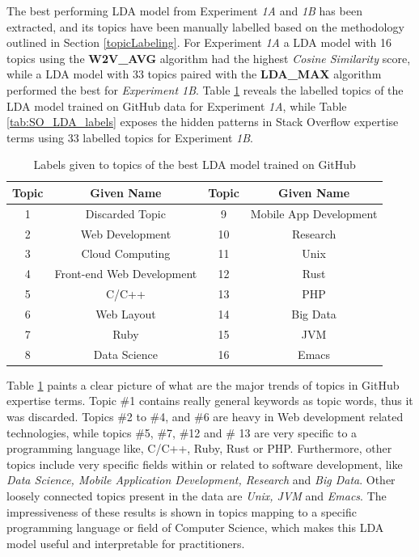            The best performing LDA model from Experiment \emph{1A} and \emph{1B} has been extracted, and its topics have been manually labelled based on the methodology outlined in Section \ref{topicLabeling}. For Experiment \emph{1A} a LDA model with 16 topics using the \textbf{W2V\_AVG} algorithm had the highest \emph{Cosine Similarity} score, while a LDA model with 33 topics paired with the \textbf{LDA\_MAX} algorithm performed the best for \emph{Experiment 1B}. Table \ref{tab:GH_LDA_labels} reveals the labelled topics of the LDA model trained on GitHub data for Experiment \emph{1A}, while Table \ref{tab:SO_LDA_labels} exposes the hidden patterns in Stack Overflow expertise terms using 33 labelled topics for Experiment \emph{1B}.
     
            \begin{table}
              \centering
              \caption{Labels given to topics of the best LDA model trained on GitHub}\label{tab:GH_LDA_labels}
                \vspace{6pt} %
              \begin{tabular}{|c c|c c|}
                \hline
                Topic & Given Name & Topic & Given Name \\
                \hline
                1 & Discarded Topic & 9 & Mobile App Development \\
                2 & Web Development & 10 & Research \\
                3 & Cloud Computing & 11 & Unix \\
                4 & Front-end Web Development & 12 & Rust \\
                5 & C/C++ & 13 & PHP \\
                6 & Web Layout & 14 & Big Data \\
                7 & Ruby & 15 & JVM \\
                8 & Data Science & 16 & Emacs \\
                \hline
              \end{tabular}%
            \end{table}
            
            Table \ref{tab:GH_LDA_labels} paints a clear picture of what are the major trends of topics in GitHub expertise terms. Topic \#1 contains really general keywords as topic words, thus it was discarded. Topics \#2 to \#4, and \#6 are heavy in Web development related technologies, while topics \#5, \#7, \#12 and \# 13 are very specific to a programming language like, C/C++, Ruby, Rust or PHP. Furthermore, other topics include very specific fields within or related to software development, like \emph{Data Science, Mobile Application Development, Research} and \emph{Big Data}. Other loosely connected topics present in the data are \emph{Unix, JVM} and \emph{Emacs}. The impressiveness of these results is shown in topics mapping to a specific programming language or field of Computer Science, which makes this LDA model useful and interpretable for practitioners.  
            
